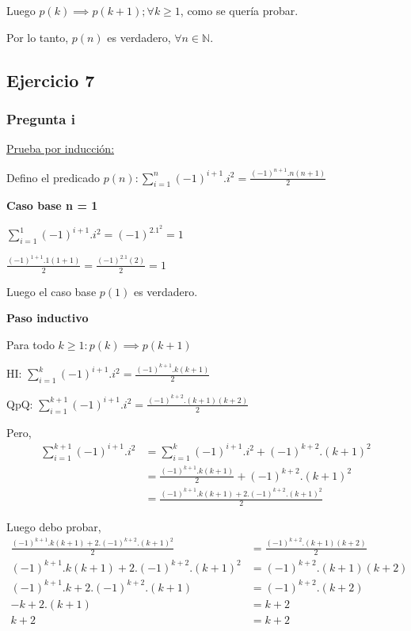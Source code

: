 Luego $p(k) \implies p(k+1); \forall k \geq 1$, como se quería probar.

Por lo tanto, $p(n)$ es verdadero, $\forall n \in \mathbb{N}$.

\subsection{Ejercicio 7}

\subsubsection{Pregunta i}

\underline{Prueba por inducción:}

Defino el predicado $p(n) : \sum_{i=1}^{n}(-1)^{i+1}.i^2= \frac{(-1)^{n+1}.n(n+1)}{2}$

\textbf{Caso base n = 1}

$ \sum_{i=1}^{1}(-1)^{i+1}.i^2 = (-1)^2.1^2=1$

$\frac{(-1)^{1+1}.1(1+1)}{2} = \frac{(-1)^2.1(2)}{2} = 1$

Luego el caso base $p(1)$ es verdadero.

\textbf{Paso inductivo}

Para todo $k \geq 1: p(k) \implies p(k+1)$

HI: $\sum_{i=1}^{k}(-1)^{i+1}.i^2 = \frac{(-1)^{k+1}.k(k+1)}{2}$

QpQ: $\sum_{i=1}^{k+1}(-1)^{i+1}.i^2 = \frac{(-1)^{k+2}.(k+1)(k+2)}{2}$

Pero,
\begin{align*}
    \sum_{i=1}^{k+1}(-1)^{i+1}.i^2 &= \sum_{i=1}^{k}(-1)^{i+1}.i^2 + (-1)^{k+2}.(k+1)^2 \\
    &= \frac{(-1)^{k+1}.k(k+1)}{2} + (-1)^{k+2}.(k+1)^2 \\
    &= \frac{(-1)^{k+1}.k(k+1) + 2.(-1)^{k+2}.(k+1)^2}{2}
\end{align*}

Luego debo probar, 
\begin{align*}
    \frac{(-1)^{k+1}.k(k+1) + 2.(-1)^{k+2}.(k+1)^2}{2} &= \frac{(-1)^{k+2}.(k+1)(k+2)}{2} \\
    (-1)^{k+1}.k(k+1) + 2.(-1)^{k+2}.(k+1)^2 &= (-1)^{k+2}.(k+1)(k+2) \\
    (-1)^{k+1}.k + 2.(-1)^{k+2}.(k+1) &= (-1)^{k+2}.(k+2) \\
    -k + 2.(k+1) &= k+2 \\
    k+2 &= k+2 \\
\end{align*}

